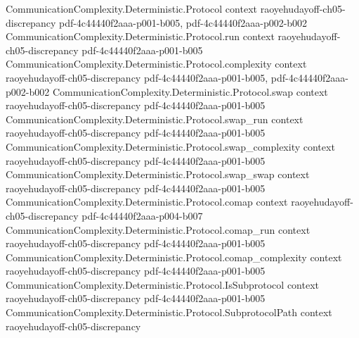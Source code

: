 \begin{lemma}
\label{CommunicationComplexity.Deterministic.Protocol.signedBias_eq_one_sub_two_distributionalError}
\leanok
{}
\proofstep
  {CommunicationComplexity.Deterministic.Protocol}
  {context}
  {raoyehudayoff-ch05-discrepancy}
  {pdf-4c44440f2aaa-p001-b005,
    pdf-4c44440f2aaa-p002-b002}
\proofstep
  {CommunicationComplexity.Deterministic.Protocol.run}
  {context}
  {raoyehudayoff-ch05-discrepancy}
  {pdf-4c44440f2aaa-p001-b005}
\proofstep
  {CommunicationComplexity.Deterministic.Protocol.complexity}
  {context}
  {raoyehudayoff-ch05-discrepancy}
  {pdf-4c44440f2aaa-p001-b005,
    pdf-4c44440f2aaa-p002-b002}
\proofstep
  {CommunicationComplexity.Deterministic.Protocol.swap}
  {context}
  {raoyehudayoff-ch05-discrepancy}
  {pdf-4c44440f2aaa-p001-b005}
\proofstep
  {CommunicationComplexity.Deterministic.Protocol.swap_run}
  {context}
  {raoyehudayoff-ch05-discrepancy}
  {pdf-4c44440f2aaa-p001-b005}
\proofstep
  {CommunicationComplexity.Deterministic.Protocol.swap_complexity}
  {context}
  {raoyehudayoff-ch05-discrepancy}
  {pdf-4c44440f2aaa-p001-b005}
\proofstep
  {CommunicationComplexity.Deterministic.Protocol.swap_swap}
  {context}
  {raoyehudayoff-ch05-discrepancy}
  {pdf-4c44440f2aaa-p001-b005}
\proofstep
  {CommunicationComplexity.Deterministic.Protocol.comap}
  {context}
  {raoyehudayoff-ch05-discrepancy}
  {pdf-4c44440f2aaa-p004-b007}
\proofstep
  {CommunicationComplexity.Deterministic.Protocol.comap_run}
  {context}
  {raoyehudayoff-ch05-discrepancy}
  {pdf-4c44440f2aaa-p001-b005}
\proofstep
  {CommunicationComplexity.Deterministic.Protocol.comap_complexity}
  {context}
  {raoyehudayoff-ch05-discrepancy}
  {pdf-4c44440f2aaa-p001-b005}
\proofstep
  {CommunicationComplexity.Deterministic.Protocol.IsSubprotocol}
  {context}
  {raoyehudayoff-ch05-discrepancy}
  {pdf-4c44440f2aaa-p001-b005}
\proofstep
  {CommunicationComplexity.Deterministic.Protocol.SubprotocolPath}
  {context}
  {raoyehudayoff-ch05-discrepancy}

\end{lemma}
